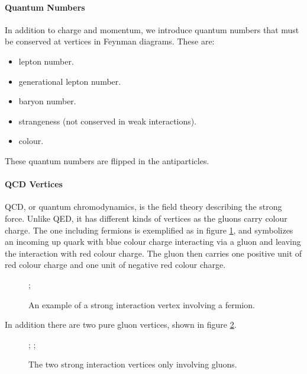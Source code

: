 \paragraph{Quantum Numbers}
In addition to charge and momentum, we introduce quantum numbers that must be conserved at vertices in Feynman diagrams. These are:
\begin{itemize}
	\item lepton number.
	\item generational lepton number.
	\item baryon number.
	\item strangeness (not conserved in weak interactions).
	\item colour.
\end{itemize}
These quantum numbers are flipped in the antiparticles.

\paragraph{QCD Vertices}
QCD, or quantum chromodynamics, is the field theory describing the strong force. Unlike QED, it has different kinds of vertices as the gluons carry colour charge. The one including fermions is exemplified as in figure \ref{fig:strong_vert_fer_ex}, and symbolizes an incoming up quark with blue colour charge interacting via a gluon and leaving the interaction with red colour charge. The gluon then carries one positive unit of red colour charge and one unit of negative red colour charge.

\begin{figure}[!ht]
	\centering
	;
	\caption{An example of a strong interaction vertex involving a fermion.}
	\label{fig:strong_vert_fer_ex}
\end{figure}

In addition there are two pure gluon vertices, shown in figure \ref{fig:strong_vert_glu}.

\begin{figure}[!ht]
	\centering
	;
	;
	\caption{The two strong interaction vertices only involving gluons.}
	\label{fig:strong_vert_glu}
\end{figure}

